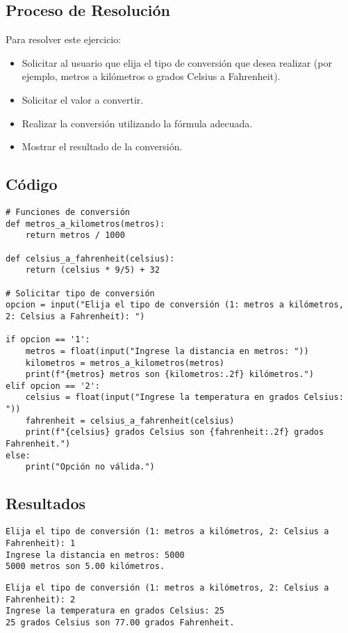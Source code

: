 \documentclass[a4paper,12pt]{article}
\begin{document}
\subsection{Proceso de Resolución}
Para resolver este ejercicio:
\begin{itemize}
    \item Solicitar al usuario que elija el tipo de conversión que desea realizar (por ejemplo, metros a kilómetros o grados Celsius a Fahrenheit).
    \item Solicitar el valor a convertir.
    \item Realizar la conversión utilizando la fórmula adecuada.
    \item Mostrar el resultado de la conversión.
\end{itemize}

\subsection{Código}
\begin{lstlisting}
# Funciones de conversión
def metros_a_kilometros(metros):
    return metros / 1000

def celsius_a_fahrenheit(celsius):
    return (celsius * 9/5) + 32

# Solicitar tipo de conversión
opcion = input("Elija el tipo de conversión (1: metros a kilómetros, 2: Celsius a Fahrenheit): ")

if opcion == '1':
    metros = float(input("Ingrese la distancia en metros: "))
    kilometros = metros_a_kilometros(metros)
    print(f"{metros} metros son {kilometros:.2f} kilómetros.")
elif opcion == '2':
    celsius = float(input("Ingrese la temperatura en grados Celsius: "))
    fahrenheit = celsius_a_fahrenheit(celsius)
    print(f"{celsius} grados Celsius son {fahrenheit:.2f} grados Fahrenheit.")
else:
    print("Opción no válida.")
\end{lstlisting}

\subsection{Resultados}
\begin{verbatim}
Elija el tipo de conversión (1: metros a kilómetros, 2: Celsius a Fahrenheit): 1
Ingrese la distancia en metros: 5000
5000 metros son 5.00 kilómetros.
\end{verbatim}

\begin{verbatim}
Elija el tipo de conversión (1: metros a kilómetros, 2: Celsius a Fahrenheit): 2
Ingrese la temperatura en grados Celsius: 25
25 grados Celsius son 77.00 grados Fahrenheit.
\end{verbatim}
\end{document}
